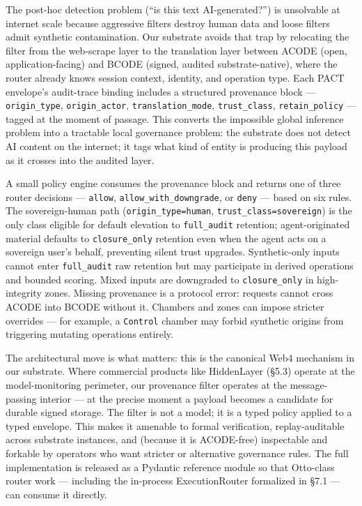 The post-hoc detection problem (``is this text AI-generated?'') is
unsolvable at internet scale because aggressive filters destroy human
data and loose filters admit synthetic contamination. Our substrate
avoids that trap by relocating the filter from the web-scrape layer to
the translation layer between ACODE (open, application-facing) and BCODE
(signed, audited substrate-native), where the router already knows
session context, identity, and operation type. Each PACT envelope's
audit-trace binding includes a structured provenance block ---
\texttt{origin\_type}, \texttt{origin\_actor},
\texttt{translation\_mode}, \texttt{trust\_class},
\texttt{retain\_policy} --- tagged at the moment of passage. This
converts the impossible global inference problem into a tractable local
governance problem: the substrate does not detect AI content on the
internet; it tags what kind of entity is producing this payload as it
crosses into the audited layer.

A small policy engine consumes the provenance block and returns one of
three router decisions --- \texttt{allow},
\texttt{allow\_with\_downgrade}, or \texttt{deny} --- based on six
rules. The sovereign-human path (\texttt{origin\_type=human},
\texttt{trust\_class=sovereign}) is the only class eligible for default
elevation to \texttt{full\_audit} retention; agent-originated material
defaults to \texttt{closure\_only} retention even when the agent acts on
a sovereign user's behalf, preventing silent trust upgrades.
Synthetic-only inputs cannot enter \texttt{full\_audit} raw retention
but may participate in derived operations and bounded scoring. Mixed
inputs are downgraded to \texttt{closure\_only} in high-integrity zones.
Missing provenance is a protocol error: requests cannot cross ACODE into
BCODE without it. Chambers and zones can impose stricter overrides ---
for example, a \texttt{Control} chamber may forbid synthetic origins
from triggering mutating operations entirely.

The architectural move is what matters: this is the canonical Web4
mechanism in our substrate. Where commercial products like HiddenLayer
(§5.3) operate at the model-monitoring perimeter, our provenance filter
operates at the message-passing interior --- at the precise moment a
payload becomes a candidate for durable signed storage. The filter is
not a model; it is a typed policy applied to a typed envelope. This
makes it amenable to formal verification, replay-auditable across
substrate instances, and (because it is ACODE-free) inspectable and
forkable by operators who want stricter or alternative governance rules.
The full implementation is released as a Pydantic reference module so
that Otto-class router work --- including the in-process ExecutionRouter
formalized in §7.1 --- can consume it directly.

